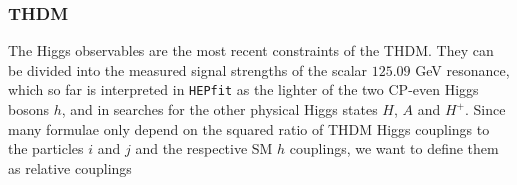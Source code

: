 \documentclass[preprint,3p,12pt]{elsarticle}
\newcommand{\HEPfit}{\texttt{HEPfit}\xspace}
\begin{document}






\subsubsection{THDM}

The Higgs observables are the most recent constraints of the THDM. They can be divided into the measured signal strengths of the scalar $125.09$ GeV resonance, which so far is interpreted in \HEPfit as the lighter of the two CP-even Higgs bosons $h$, and in searches for the other physical Higgs states $H$, $A$ and $H^+$. Since many formulae only depend on the squared ratio of THDM Higgs couplings to the particles $i$ and $j$ and the respective SM $h$ couplings, we want to define them as relative couplings
\end{document}
